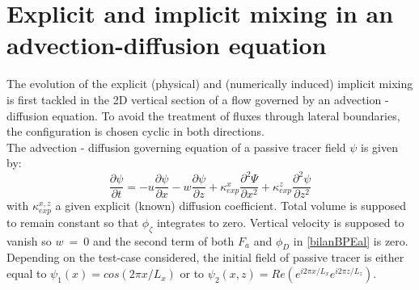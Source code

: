 \section{Explicit and implicit mixing in an advection-diffusion equation}
The evolution of the explicit (physical) and (numerically induced) implicit mixing is first tackled in the 2D vertical section of a flow governed by an advection - diffusion 
equation. To avoid the treatment of fluxes through lateral boundaries, the configuration is chosen cyclic in both directions.\\
The advection - diffusion governing equation of a passive tracer field $\psi$ is given by:
\begin{equation}
\frac{\partial \psi}{\partial t} = -u\frac{\partial \psi}{\partial x} - w\frac{\partial \psi}{\partial z} + \kappa_{exp}^x \frac{\partial^2 \Psi}{\partial x^2} + \kappa_{exp}^z \frac{\partial^2 \psi}{\partial z^2}
\end{equation}
with $\kappa_{exp}^{x,z}$ a given explicit (known) diffusion coefficient.
Total volume is supposed to remain constant so that $\phi_{\zeta}$ integrates to zero. Vertical velocity is supposed to vanish so $w\ =\ 0$ and the second term of both $F_a$ and $\phi_D$ in \ref{bilanBPEal} is zero.
Depending on the test-case considered, the initial field of passive tracer is either equal to $\psi_1(x)=cos(2\pi x/L_x)$ or to $\psi_2(x,z)=Re(e^{i2\pi x/L_x}e^{i 2 \pi z/L_z})$.

